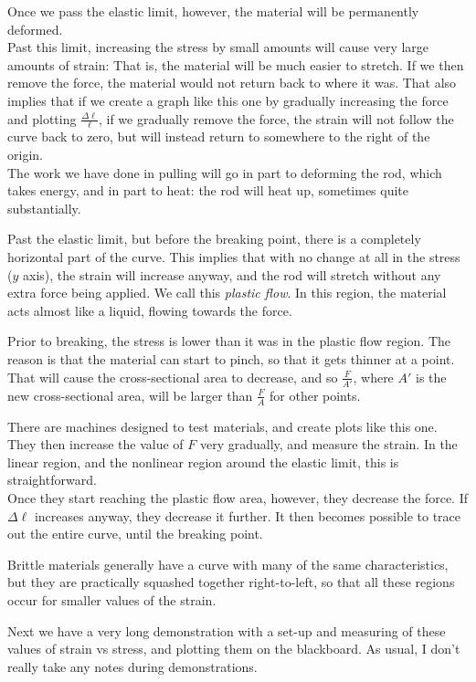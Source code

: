 Once we pass the elastic limit, however, the material will be permanently deformed.\\
Past this limit, increasing the stress by small amounts will cause very large amounts of strain: That is, the material will be much easier to stretch. If we then remove the force, the material would not return back to where it was. That also implies that if we create a graph like this one by gradually increasing the force and plotting $\displaystyle \frac{\Delta \ell}{\ell}$, if we gradually remove the force, the strain will not follow the curve back to zero, but will instead return to somewhere to the right of the origin.\\
The work we have done in pulling will go in part to deforming the rod, which takes energy, and in part to heat: the rod will heat up, sometimes quite substantially.

Past the elastic limit, but before the breaking point, there is a completely horizontal part of the curve. This implies that with no change at all in the stress ($y$ axis), the strain will increase anyway, and the rod will stretch without any extra force being applied. We call this \emph{plastic flow}. In this region, the material acts almost like a liquid, flowing towards the force.

Prior to breaking, the stress is lower than it was in the plastic flow region. The reason is that the material can start to pinch, so that it gets thinner at a point. That will cause the cross-sectional area to decrease, and so $\displaystyle \frac{F}{A'}$, where $A'$ is the new cross-sectional area, will be larger than $\displaystyle \frac{F}{A}$ for other points.

There are machines designed to test materials, and create plots like this one. They then increase the value of $F$ very gradually, and measure the strain. In the linear region, and the nonlinear region around the elastic limit, this is straightforward.\\
Once they start reaching the plastic flow area, however, they decrease the force. If $\Delta \ell$ increases anyway, they decrease it further. It then becomes possible to trace out the entire curve, until the breaking point.

Brittle materials generally have a curve with many of the same characteristics, but they are practically squashed together right-to-left, so that all these regions occur for smaller values of the strain.

Next we have a very long demonstration with a set-up and measuring of these values of strain vs stress, and plotting them on the blackboard. As usual, I don't really take any notes during demonstrations.

